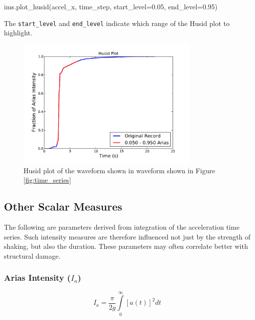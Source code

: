 \begin{itemize}
\begin{python}
ims.plot_husid(accel_x,
               time_step,
               start_level=0.05,
               end_level=0.95)
\end{python}

The \verb=start_level= and \verb=end_level= indicate which range of the Husid plot to highlight.

\begin{figure}[htb]
	\centering
		\includegraphics[width=0.8\textwidth]{./figures/ims/HusidPlotExample.pdf}
	\caption{Husid plot of the waveform shown in waveform shown in Figure \ref{fig:time_series}}
	\label{fig:husid_plot}
\end{figure}

\end{itemize}

\subsection{Other Scalar Measures}

The following are parameters derived from integration of the acceleration time series. Such intensity measures are therefore influenced not just by the strength of shaking, but also the duration. These parameters may often correlate better with structural damage.

\subsubsection{Arias Intensity ($I_a$)}

\begin{equation}
I_a =\frac{\pi}{2g} \int\limits_0^{\infty} \left[ {a \left( t \right)}\right]^2 dt
\end{equation}


